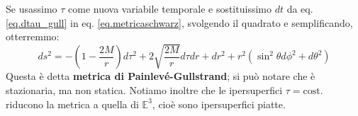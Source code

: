 Se usassimo $\tau$ come nuova variabile temporale e sostituissimo $dt$ da eq. \ref{eq.dtau_gull} in eq. \ref{eq.metricaschwarz}, svolgendo il quadrato e semplificando, otterremmo:
\begin{equation}
    ds^2 = - \left( 1 - \frac{2M}{r}\right) d\tau^2 + 2\sqrt{\frac{2M}{r}}d\tau dr + dr^2 + r^2(\sin^2\theta d\phi^2 + d\theta^2)
    \label{eq.metrica_paingull}
\end{equation}
Questa è detta \textbf{metrica di Painlevé-Gullstrand}; si può notare che è stazionaria, ma non statica. Notiamo inoltre che le ipersuperfici $\tau = \textrm{cost.}$ riducono la metrica a quella di $\mathbb{E}^3$, cioè sono ipersuperfici piatte.
